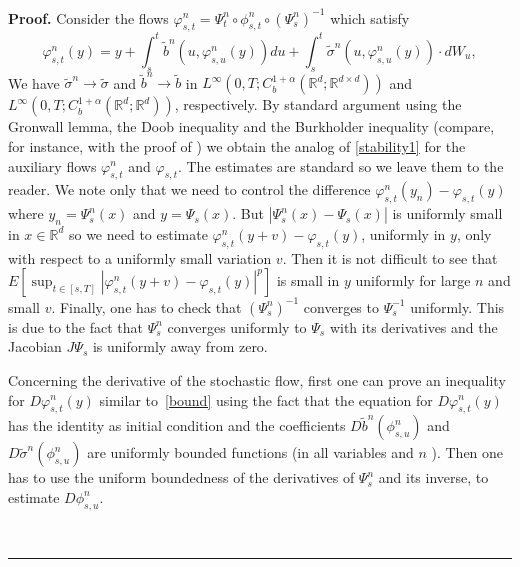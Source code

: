 \documentclass[a4paper,11pt]{article}
\newenvironment{proof}[1][Proof]{\textbf{#1.} }{\ \rule{0.5em}{0.5em}}
\begin{document}
\begin{proof}
Consider the flows $\varphi _{s,t}^{n}=\Psi _{t}^{n}\circ \phi
_{s,t}^{n}\circ (\Psi _{s}^{n})^{-1}$ which satisfy
\begin{equation}
\varphi _{s,t}^{n}(y)=y+\int_{s}^{t}\widetilde{b}^{n}(u,\varphi
_{s,u}^{n}(y))du+\int_{s}^{t}\widetilde{\sigma }^{n}(u,\varphi
_{s,u}^{n}(y))\cdot dW_{u},
\end{equation}
We have $\widetilde{\sigma }^{n}\rightarrow \widetilde{\sigma }$ and $%
\widetilde{b}^{n}\rightarrow \widetilde{b}$ in $L^{\infty }\left(
0,T;C_{b}^{1+\alpha }({\mathbb{R}}^{d};{\mathbb{R}}^{d\times d})\right) $
and $L^{\infty }\left( 0,T;C_{b}^{1+\alpha }({\mathbb{R}}^{d};{\mathbb{R}}%
^{d})\right) $, respectively. By standard argument using the Gronwall lemma,
the Doob inequality and the Burkholder inequality %
%
%
%
%
%
%
%
(compare, for instance, with the proof of \cite[Theorem II.2.1]{K}) we
obtain the analog of \eqref{stability1} for the auxiliary flows $\varphi
_{s,t}^{n}$ and $\varphi _{s,t}$. The estimates are standard so we leave them to the reader. We note only that we need to control the difference
$\varphi _{s,t}^{n}(y_{n})-\varphi _{s,t}(y)$ where $y_{n}=\Psi _{s}^{n}( x) $ and $y=\Psi _{s}( x)$. But $| \Psi _{s}^{n}( x) -\Psi
_{s}( x) | $ is  uniformly small in $x\in {\mathbb{R}}^{d}$
so we need to estimate $\varphi _{s,t}^{n}(y+v)-\varphi _{s,t}(y)$,
uniformly in $y$, only with respect to a uniformly small variation $v$. Then it is not
difficult to see that $E[ \sup_{t\in [ s,T] }| \varphi
_{s,t}^{n}(y+v)-\varphi _{s,t}(y)| ^{p}] $ is small in
$y$ uniformly for large $n$ and small $v$. Finally, one has to check that $%
(\Psi _{s}^{n})^{-1}$ converges to $\Psi _{s}^{-1}$ uniformly. This is due
to the fact that $\Psi _{s}^{n}$ converges uniformly to $\Psi _{s}$ with its
derivatives and the Jacobian $J\Psi _{s}$ is uniformly away from zero.

Concerning the derivative of the stochastic flow, first one can prove an
inequality for $D\varphi _{s,t}^{n}(y)$ similar to~\eqref{bound} using the
fact that the equation for $D\varphi _{s,t}^{n}(y)$ has the identity as
initial condition and the coefficients $D\widetilde{b}^{n}\left( \phi
_{s,u}^{n}\right) $ and $D\widetilde{\sigma }^{n}\left( \phi
_{s,u}^{n}\right) $ are uniformly bounded functions (in all variables and $n$%
). Then one has to use the uniform boundedness of the derivatives of $\Psi
_{s}^{n}$ and its inverse, to estimate $D\phi _{s,u}^{n}$.


\end{proof}
\end{document}
